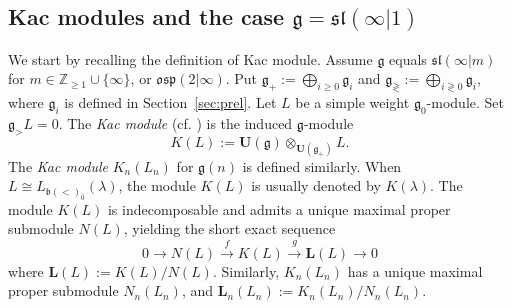 \documentclass[12pt]{amsart}
\newcommand\Z{\mathbb{Z}}
\newcommand\g{\mathfrak{g}}
\newcommand\fq{\mathfrak{q}}
\newcommand\fb{\mathfrak{b}}
\newcommand\fsl{\mathfrak{sl}}
\newcommand\fosp{\mathfrak{osp}}
\newcommand\cB{\mathcal{B}}
\newcommand\bU{\mathbf{U}}
\newcommand\bL{\mathbf{L}}
\DeclareMathOperator{\Int}{Int}
\theoremstyle{plain}
\newtheorem{theo}{Theorem}[section]
\theoremstyle{definition}
\numberwithin{equation}{section}
\begin{document}

\subsection{Kac modules and the case $\g=\fsl(\infty|1)$}\label{sec:Kac-exts}
We start by recalling the definition of Kac module. Assume $\g$ equals $\fsl(\infty|m)$ for $m\in \Z_{\geq 1}\cup\{\infty\}$, or $\fosp(2|\infty)$. Put $\g_+ := \bigoplus_{i\geq 0} \g_i$ and $\g_{\gtrless} := \bigoplus_{i\gtrless 0} \g_i$, where $\g_i$ is defined in Section~\ref{sec:prel}. Let $L$ be a simple weight $\g_{0}$-module. Set $\g_> L=0$. The \emph{Kac module} (cf. \cite{Kac78}) is the induced $\g$-module
	\[
K(L):=\bU(\g)\otimes_{\bU(\g_+)} L.
	\]
The \emph{Kac module} $K_n(L_n)$ for $\g(n)$ is defined similarly. When $L\cong L_{\fb(<)_{\bar 0}}(\lambda)$, the module $K(L)$ is usually denoted by $K(\lambda)$. The module $K(L)$ is indecomposable and admits a unique maximal proper submodule $N(L)$, yielding the short exact sequence
	\[
0\to N(L) \stackrel{f}{\longrightarrow} K(L) \stackrel{g}{\longrightarrow} \bL(L)\to 0
	\]
where $\bL(L):=K(L)/N(L)$. Similarly, $K_n(L_n)$ has a unique maximal proper submodule $N_n(L_n)$, and $\bL_n(L_n) := K_n(L_n)/N_n(L_n)$.
\end{document}
